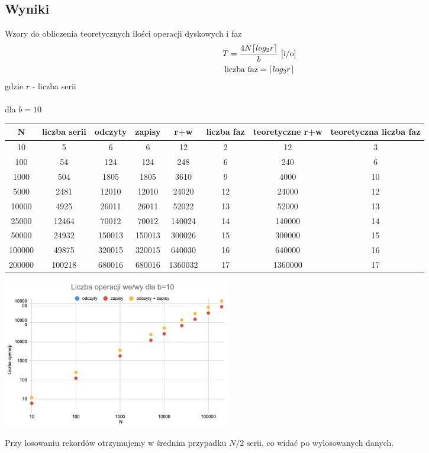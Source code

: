 \documentclass{article}
\DeclarePairedDelimiter\ceil{\lceil}{\rceil}
\begin{document}
\subsection{Wyniki}
Wzory do obliczenia teoretycznych ilości operacji dyskowych i faz
\begin{gather*}
	T = \frac{4N\ceil{log_2r}}{b} \text{  [i/o]} \\
	\text{liczba faz} = \ceil{log_2r}
\end{gather*}
gdzie $r$ - liczba serii \\\\
dla $b=10$
\begin{center}
\begin{tabular}{ c c | c c c c | c c}
 N & liczba serii &odczyty & zapisy & r+w & liczba faz & teoretyczne r+w & teoretyczna liczba faz\\ 
\hline
 10 & 5 & 6 & 6 & 12 & 2 & 12 & 3\\  
 100 & 54 & 124 & 124 & 248 & 6 & 240 & 6 \\
 1000 & 504 & 1805 & 1805 & 3610 & 9 & 4000 & 10\\
 5000 & 2481 & 12010 & 12010 & 24020 & 12 & 24000 & 12\\
 10000 & 4925 & 26011 & 26011 & 52022 & 13 & 52000 & 13 \\
 25000 & 12464 &  70012 & 70012 & 140024 & 14 & 140000 & 14 \\
 50000 & 24932 & 150013 & 150013 & 300026 & 15 & 300000 & 15\\
 100000 & 49875 & 320015 & 320015 & 640030 & 16 & 640000 & 16\\
 200000 & 100218 & 680016 & 680016 & 1360032 & 17 & 1360000 & 17\\
\end{tabular}
\includegraphics[width=10cm]{b10}
\end{center}
Przy losowaniu rekordów otrzymujemy w średnim przypadku $N/2$ serii, co widać  po wylosowanych danych.
\end{document}
